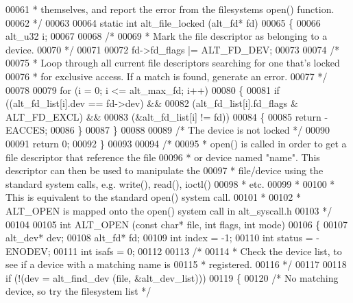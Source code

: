\begin{DoxyCode}
00061 \textcolor{comment}{ * themselves, and report the error from the filesystems open() function. }
00062 \textcolor{comment}{ */} 
00063 
00064 \textcolor{keyword}{static} \textcolor{keywordtype}{int} alt_file_locked (alt_fd* fd)
00065 \{
00066   alt_u32 i;
00067 
00068   \textcolor{comment}{/*}
00069 \textcolor{comment}{   * Mark the file descriptor as belonging to a device.}
00070 \textcolor{comment}{   */}
00071 
00072   fd->fd_flags |= ALT_FD_DEV;
00073 
00074   \textcolor{comment}{/*}
00075 \textcolor{comment}{   * Loop through all current file descriptors searching for one that's locked}
00076 \textcolor{comment}{   * for exclusive access. If a match is found, generate an error.}
00077 \textcolor{comment}{   */}
00078 
00079   \textcolor{keywordflow}{for} (i = 0; i <= alt_max_fd; i++)
00080   \{
00081     \textcolor{keywordflow}{if} ((alt_fd_list[i].dev == fd->dev) &&
00082         (alt_fd_list[i].fd_flags & ALT_FD_EXCL) &&
00083         (&alt_fd_list[i] != fd))
00084     \{
00085       \textcolor{keywordflow}{return} -EACCES;
00086     \}
00087   \}
00088   
00089   \textcolor{comment}{/* The device is not locked */}
00090  
00091   \textcolor{keywordflow}{return} 0;
00092 \}
00093 
00094 \textcolor{comment}{/*}
00095 \textcolor{comment}{ * open() is called in order to get a file descriptor that reference the file}
00096 \textcolor{comment}{ * or device named "name". This descriptor can then be used to manipulate the}
00097 \textcolor{comment}{ * file/device using the standard system calls, e.g. write(), read(), ioctl()}
00098 \textcolor{comment}{ * etc.}
00099 \textcolor{comment}{ *}
00100 \textcolor{comment}{ * This is equivalent to the standard open() system call.}
00101 \textcolor{comment}{ *}
00102 \textcolor{comment}{ * ALT\_OPEN is mapped onto the open() system call in alt\_syscall.h}
00103 \textcolor{comment}{ */}
00104  
00105 \textcolor{keywordtype}{int} ALT_OPEN (\textcolor{keyword}{const} \textcolor{keywordtype}{char}* file, \textcolor{keywordtype}{int} flags, \textcolor{keywordtype}{int} mode)
00106 \{ 
00107   alt_dev* dev;
00108   alt_fd*  fd;
00109   \textcolor{keywordtype}{int} index  = -1;
00110   \textcolor{keywordtype}{int} status = -ENODEV;
00111   \textcolor{keywordtype}{int} isafs = 0;
00112 
00113   \textcolor{comment}{/* }
00114 \textcolor{comment}{   * Check the device list, to see if a device with a matching name is }
00115 \textcolor{comment}{   * registered.}
00116 \textcolor{comment}{   */}
00117   
00118   \textcolor{keywordflow}{if} (!(dev = alt_find_dev (file, &alt\_dev\_list)))
00119   \{
00120     \textcolor{comment}{/* No matching device, so try the filesystem list */}

\end{DoxyCode}
